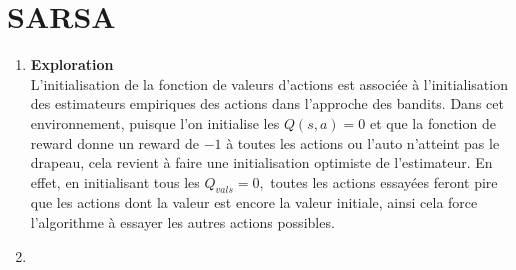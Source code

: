 \documentclass[letterpaper,11pt]{article}
\begin{document}
\section{SARSA}

\begin{enumerate}[label=(\alph*)]

\item \textbf{Exploration}\\
L'initialisation de la fonction de valeurs d'actions est associée à l'initialisation des estimateurs empiriques des actions dans l'approche des bandits. Dans cet environnement, puisque l'on initialise les $Q(s,a)=0$ et que la fonction de reward donne un reward de $-1$ à toutes les actions ou l'auto n'atteint pas le drapeau, cela revient à faire une initialisation optimiste de l'estimateur. En effet, en initialisant tous les $Q_{vals}=0,$ toutes les actions essayées feront pire que les actions dont la valeur est encore la valeur initiale, ainsi cela force l'algorithme à essayer les autres actions possibles.

\item

\end{enumerate}
\end{document}
